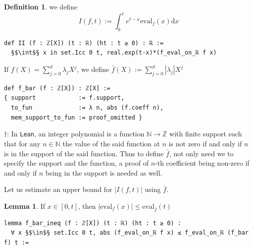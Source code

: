 \documentclass{report}
\theoremstyle{definition}
\newtheorem{lemma}{Lemma}[section]
\newtheorem{definition}{Definition}[section]
\begin{document}
\begin{definition}
we define
$$
I(f,t):=\int_0^t e^{t-x}\mathrm{eval}_f(x)\mathrm{d}x
$$

\begin{verbatim}
def II (f : ℤ[X]) (t : ℝ) (ht : t ≥ 0) : ℝ := 
  §$\int$§ x in set.Icc 0 t, real.exp(t-x)*(f_eval_on_ℝ f x) 
\end{verbatim}

If $f(X)=\sum_{j=0}^d\lambda_j X^j$, we define $\bar f(X):=\sum_{j=0}^d\left|\lambda_j\right|X^j$

\begin{verbatim}
def f_bar (f : ℤ[X]) : ℤ[X] :=
{ support            := f.support,
  to_fun             := λ n, abs (f.coeff n),
  mem_support_to_fun := proof_omitted }
\end{verbatim}
$\dagger$: In {\tt Lean}, an integer polynomial is a function $\mathbb N\to\mathbb Z$ with finite support such that for any $n\in\mathbb N$ the value of the said function at $n$ is not zero if and only if $n$ is in the support of the said function. Thus to define $\bar f$, not only need we to specify the support and the function, a proof of $n$-th coefficient being non-zero if and only if $n$ being in the support is needed as well.
\end{definition}

Let us estimate an upper bound for $\left|I(f,t)\right|$ using $\bar f$.

\begin{lemma}\label{lemma:absf}
If $x\in[0,t]$, then $\left|\mathrm{eval}_f(x)\right|\le\mathrm{eval}_{\bar f}(t)$

\begin{verbatim}
lemma f_bar_ineq (f : ℤ[X]) (t : ℝ) (ht : t ≥ 0) : 
  ∀ x §$\in$§ set.Icc 0 t, abs (f_eval_on_ℝ f x) ≤ f_eval_on_ℝ (f_bar f) t :=
\end{verbatim}
\end{lemma}
\end{document}
